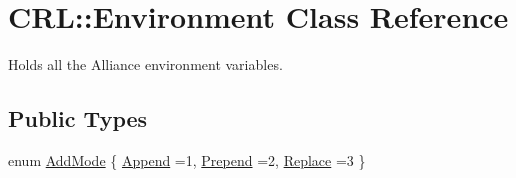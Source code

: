\hypertarget{classCRL_1_1Environment}{}\section{C\+RL\+:\+:Environment Class Reference}
\label{classCRL_1_1Environment}


Holds all the Alliance environment variables.  


\subsection*{Public Types}
\begin{DoxyCompactItemize}
\item 
enum \mbox{\hyperlink{classCRL_1_1Environment_ac5692c2f5d20e892573a3d46de222aeb}{Add\+Mode}} \{ \newline
\mbox{\hyperlink{classCRL_1_1Environment_ac5692c2f5d20e892573a3d46de222aeba69ce578d2eeb6a8de507920ccf673b8d}{Append}} =1, 
\newline
\mbox{\hyperlink{classCRL_1_1Environment_ac5692c2f5d20e892573a3d46de222aeba9acc311bf991f5e62be5ea9333083fd0}{Prepend}} =2, 
\newline
\mbox{\hyperlink{classCRL_1_1Environment_ac5692c2f5d20e892573a3d46de222aeba61fc1f828e487ed148c456f3d37be83a}{Replace}} =3
 \}
\end{DoxyCompactItemize}
